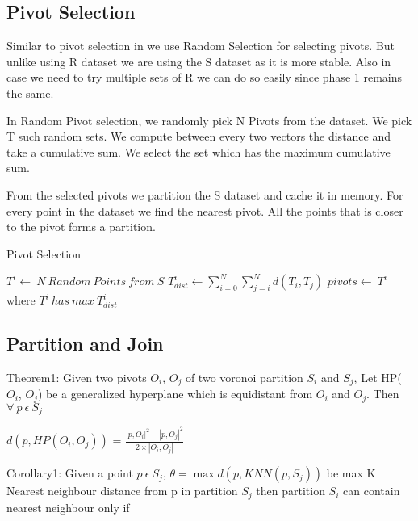 \documentclass[conference]{IEEEtran}
\begin{document}
\subsection{Pivot Selection}
Similar to pivot selection in \cite{lu_efficient_2012} we use Random
Selection for selecting pivots. But unlike using R dataset we are
using the S dataset as it is more stable. Also in case we need to try
multiple sets of R we can do so easily since phase 1 remains the
same.

In Random Pivot selection, we randomly pick N Pivots from the
dataset. We pick T such random sets. We compute between every two
vectors the distance and take a cumulative sum. We select the set
which has the maximum cumulative sum.

From the selected pivots we partition the S dataset and cache it in
memory. For every point in the dataset we find the nearest pivot. All
the points that is closer to the pivot forms a partition.

\begin{algorithm}
  \caption{Pivot Selection}
  \label{algo_pivot_selection}
  \begin{algorithmic}[1]
    \STATE $T^i  \leftarrow \ N\ Random\ Points\ from\ S$
    \STATE $T_{dist}^i \leftarrow \sum\limits_{i=0}^N\sum\limits_{j=i}^N d(T_i, T_j)$
    \ENDFOR
    \STATE $pivots \leftarrow\ T^i$ where $T^i\ has\ max\ T^i_{dist}$
  \end{algorithmic}
\end{algorithm}

\subsection{Partition and Join}

\bigskip

Theorem1: \cite{lu_efficient_2012} Given two pivots $O_i$, $O_j$ of two voronoi
partition $S_i$ and $S_j$, Let HP($O_i$, $O_j$) be a generalized
hyperplane which is equidistant from $O_i$ and $O_j$. Then $\forall\ p\
\epsilon\ S_j$

\medskip

$d(p, HP(O_i, O_j))$ = $\frac{|p,O_i|^2 - |p,O_j|^2}{2 \times |O_i, O_j|}$

\bigskip

Corollary1: Given a point $p\ \epsilon\ S_j$, $\theta = \max{d(p, KNN(p, S_j))}$ be max K Nearest
neighbour distance from p in partition $S_j$ then partition
$S_i$ can contain nearest neighbour only if
\end{document}
